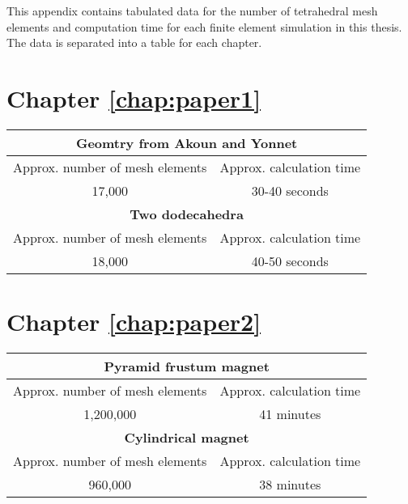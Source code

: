 This appendix contains tabulated data for the number of tetrahedral mesh elements and computation time for each finite element simulation in this thesis. The data is separated into a table for each chapter.
\section{Chapter \ref{chap:paper1}}
\begin{table}[h!]
    \centering
    \begin{tabular}{cc}
        \hline \hline \multicolumn{2}{c}{\textbf{Geomtry from Akoun and Yonnet}} \\ \hline
         Approx. number of mesh elements & Approx. calculation time \\
         17,000 & 30-40 seconds \\ \hline\hline
         \multicolumn{2}{c}{\textbf{Two dodecahedra}} \\ \hline
         Approx. number of mesh elements & Approx. calculation time \\
         18,000 & 40-50 seconds \\ \hline\hline
    \end{tabular}
\end{table}
\newpage
\section{Chapter \ref{chap:paper2}}
\begin{table}[h!]
    \centering
    \begin{tabular}{cc}
        \hline \hline \multicolumn{2}{c}{\textbf{Pyramid frustum magnet}} \\ \hline
         Approx. number of mesh elements & Approx. calculation time \\
         1,200,000 & 41 minutes \\ \hline\hline
         \multicolumn{2}{c}{\textbf{Cylindrical magnet}} \\ \hline
         Approx. number of mesh elements & Approx. calculation time \\
         960,000 & 38 minutes \\ \hline\hline
    \end{tabular}
\end{table}
